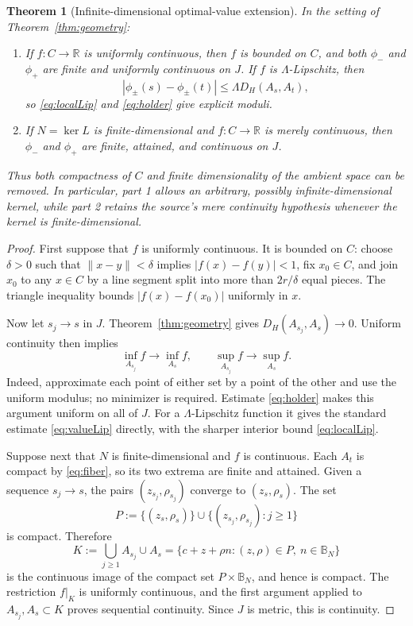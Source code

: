 \documentclass[11pt]{article}
\newcommand{\R}{\mathbb R}
\newcommand{\B}{\mathbb B}
\newtheorem{theorem}{Theorem}
\begin{document}
\begin{theorem}[Infinite-dimensional optimal-value extension]\label{thm:values}
In the setting of Theorem~\ref{thm:geometry}:
\begin{enumerate}
\item If $f:C\to\R$ is uniformly continuous, then $f$ is bounded on
  $C$, and both $\phi_-$ and $\phi_+$ are finite and uniformly continuous
  on $J$.  If $f$ is
  $\Lambda$-Lipschitz, then
  \begin{equation}\label{eq:valueLip}
  |\phi_\pm(s)-\phi_\pm(t)|\le\Lambda D_H(A_s,A_t),
  \end{equation}
  so \eqref{eq:localLip} and \eqref{eq:holder} give explicit moduli.
\item If $N=\ker L$ is finite-dimensional and $f:C\to\R$ is merely
  continuous, then $\phi_-$ and $\phi_+$ are finite, attained, and
  continuous on $J$.
\end{enumerate}
Thus both compactness of $C$ and finite dimensionality of the ambient space
can be removed.  In particular, part 1 allows an arbitrary, possibly
infinite-dimensional kernel, while part 2 retains the source's mere
continuity hypothesis whenever the kernel is finite-dimensional.
\end{theorem}

\begin{proof}
First suppose that $f$ is uniformly continuous.  It is bounded on $C$:
choose $\delta>0$ such that $\|x-y\|<\delta$ implies
$|f(x)-f(y)|<1$, fix $x_0\in C$, and join $x_0$ to any $x\in C$
by a line segment split into more than $2r/\delta$ equal pieces.  The
triangle inequality bounds $|f(x)-f(x_0)|$ uniformly in $x$.

Now let $s_j\to s$ in $J$.  Theorem~\ref{thm:geometry} gives
$D_H(A_{s_j},A_s)\to0$.  Uniform continuity then implies
\[
 \inf_{A_{s_j}}f\longrightarrow\inf_{A_s}f,
 \qquad
 \sup_{A_{s_j}}f\longrightarrow\sup_{A_s}f.
\]
Indeed, approximate each point of either set by a point of the other and use
the uniform modulus; no minimizer is required.  Estimate \eqref{eq:holder}
makes this argument uniform on all of $J$.  For a $\Lambda$-Lipschitz
function it gives the standard estimate \eqref{eq:valueLip} directly, with
the sharper interior bound \eqref{eq:localLip}.

Suppose next that $N$ is finite-dimensional and $f$ is continuous.  Each
$A_t$ is compact by \eqref{eq:fiber}, so its two extrema are finite and
attained.  Given a sequence $s_j\to s$, the pairs
$(z_{s_j},\rho_{s_j})$ converge to $(z_s,\rho_s)$.  The set
\[
 P:=\{(z_s,\rho_s)\}\cup\{(z_{s_j},\rho_{s_j}):j\ge1\}
\]
is compact.  Therefore
\[
 K:=\bigcup_{j\ge1}A_{s_j}\cup A_s
 =\{c+z+\rho n:(z,\rho)\in P,\ n\in\B_N\}
\]
is the continuous image of the compact set $P\times\B_N$, and hence is
compact.  The restriction $f|_K$ is uniformly
continuous, and the first argument applied to $A_{s_j},A_s\subset K$
proves sequential continuity.  Since $J$ is metric, this is continuity.
\end{proof}
\end{document}
